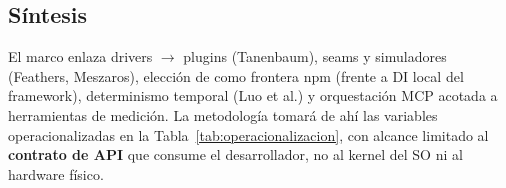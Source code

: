 \subsection{Síntesis}
\label{sec:sintesis_marco}
El marco enlaza drivers $\rightarrow$ plugins (Tanenbaum), seams y simuladores (Feathers, Meszaros), elección de  como frontera npm (frente a DI local del framework), determinismo temporal (Luo et al.) y orquestación MCP acotada a herramientas de medición. La metodología tomará de ahí las variables operacionalizadas en la Tabla~\ref{tab:operacionalizacion}, con alcance limitado al \textbf{contrato de API} que consume el desarrollador, no al kernel del SO ni al hardware físico.
